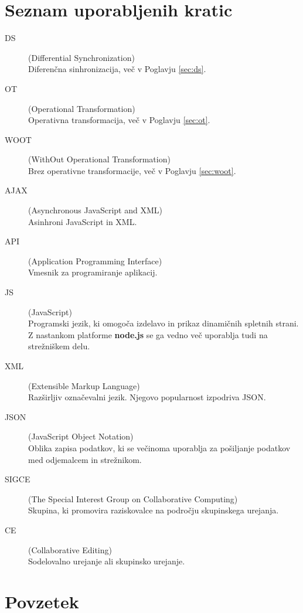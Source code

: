 \documentclass[a4paper, 12pt, twoside]{book}
\newcommand{\clearemptydoublepage}{\newpage{\pagestyle{empty}\cleardoublepage}} %
\begin{document}
\chapter*{Seznam uporabljenih kratic}
\begin{description}
    \item[DS] (Differential Synchronization) \\Diferenčna sinhronizacija, več v Poglavju \ref{sec:ds}.
	\item[OT] (Operational Transformation) \\Operativna transformacija, več v Poglavju \ref{sec:ot}.
	\item[WOOT] (WithOut Operational Transformation) \\Brez operativne transformacije, več v Poglavju \ref{sec:woot}.
	\item[AJAX] (Asynchronous JavaScript and XML) \\Asinhroni JavaScript in XML.
	\item[API] (Application Programming Interface) \\Vmesnik za programiranje aplikacij.
	\item[JS] (JavaScript) \\Programski jezik, ki omogoča izdelavo in prikaz dinamičnih spletnih strani. Z nastankom platforme \textbf{node.js} se ga vedno več uporablja tudi na strežniškem delu.
	\item[XML] (Extensible Markup Language) \\Razširljiv označevalni jezik. Njegovo popularnost izpodriva JSON.
    \item[JSON] (JavaScript Object Notation) \\Oblika zapisa podatkov, ki se večinoma uporablja za pošiljanje podatkov med odjemalcem in strežnikom.
	\item[SIGCE] (The Special Interest Group on Collaborative Computing) \\Skupina, ki promovira raziskovalce na področju skupinskega urejanja.
    \item[CE] (Collaborative Editing) \\Sodelovalno urejanje ali skupinsko urejanje.
\end{description}

\clearemptydoublepage

\chapter*{Povzetek}
\end{document}
